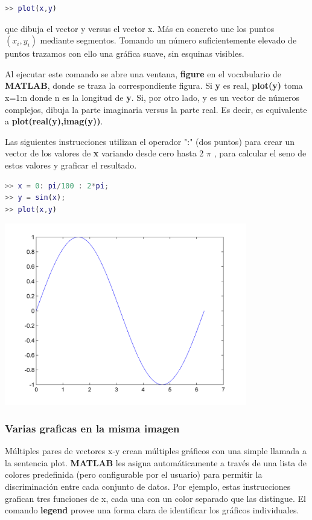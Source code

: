 \begin{lstlisting}[language=Matlab]
>> plot(x,y)
\end{lstlisting}

que dibuja el vector y versus el vector x. Más en concreto une los puntos $(x_{i}, y_{i})$ mediante segmentos. Tomando un número suficientemente elevado de puntos trazamos con ello una gráfica suave, sin esquinas visibles.

Al ejecutar este comando se abre una ventana, \textbf{figure} en el vocabulario de \textbf{MATLAB}, donde se traza la correspondiente figura. Si \textbf{y} es real, \textbf{plot(y)} toma x=1:n donde n es la longitud de \textbf{y}. Si, por otro lado, y es un vector de números complejos, dibuja la parte imaginaria versus la parte real. Es decir, es equivalente a \textbf{plot(real(y),imag(y))}.

Las siguientes instrucciones utilizan el operador ":" (dos puntos) para crear un vector de los valores de \textbf{x} variando desde cero hasta 2 $\pi$ , para calcular el seno de estos valores y graficar el resultado.

\begin{lstlisting}[language=Matlab]
>> x = 0: pi/100 : 2*pi; 
>> y = sin(x); 
>> plot(x,y)
\end{lstlisting}

\begin{center}
\includegraphics[width=300pt]{./Imagenes/seno1.png}
\end{center}

\subsubsection{Varias graficas en la misma imagen}

Múltiples pares de vectores x-y crean múltiples gráficos con una simple llamada a la sentencia 
plot. \textbf{MATLAB} les asigna automáticamente a través de una lista de colores predefinida (pero configurable por el usuario) para permitir la discriminación entre cada conjunto de datos. Por ejemplo, estas instrucciones grafican tres funciones de x, cada una con un color separado que las distingue. El comando \textbf{legend} provee una forma clara de identificar los gráficos individuales. 


